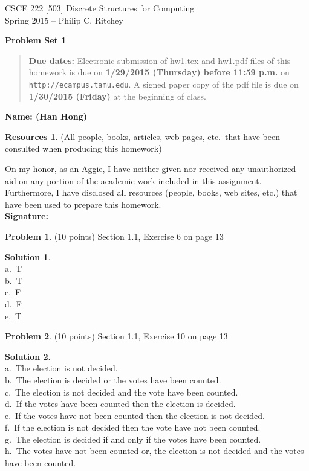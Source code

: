 \documentclass{article}
\theoremstyle{definition}
\newtheorem{problem}{Problem}
\newtheorem*{solution}{Solution}
\newtheorem*{resources}{Resources}
\newcommand{\name}[1]{\noindent\textbf{Name: #1}}
\newcommand{\honor}{\noindent On my honor, as an Aggie, I have neither
  given nor received any unauthorized aid on any portion of the
  academic work included in this assignment. Furthermore, I have
  disclosed all resources (people, books, web sites, etc.) that have
  been used to prepare this homework. \\[2ex]
 \textbf{Signature:} \underline{\hspace*{7cm}} }
\newcommand{\problemset}[1]{\begin{center}\textbf{Problem Set #1}\end{center}}
\newcommand{\duedate}[2]{\begin{quote}\textbf{Due dates:} Electronic
    submission of hw1.tex and hw1.pdf files of this homework is due on
    \textbf{#1} on \texttt{http://ecampus.tamu.edu}.  A signed paper copy of the pdf file is due on
    \textbf{#2} at the beginning of class.\end{quote} }
\begin{document}
\begin{center}
{\large
CSCE 222 [503] Discrete Structures for Computing\\[.5ex]
Spring 2015 -- Philip C. Ritchey\\}
\end{center}

\problemset{1}

\duedate{1/29/2015 (Thursday) before 11:59 p.m.}{1/30/2015 (Friday)}

\name{ (Han Hong) }

\begin{resources} (All people, books, articles, web pages, etc.\ that
  have been consulted when producing this homework)
\end{resources}

\honor

\bigskip

\begin{problem} (10 points) Section 1.1, Exercise 6 on page 13
\end{problem}
\begin{solution}~\\
a.\ T\\
b.\ T\\
c.\ F\\
d.\ F\\
e.\ T\\
\end{solution}

\begin{problem} (10 points) Section 1.1, Exercise 10 on page 13
\end{problem}
\begin{solution}~\\ 
a.\ The election is not decided.\\
b.\ The election is decided or the votes have been counted.\\
c.\ The election is not decided and the vote have been counted.\\
d.\ If the votes have been counted then the election is decided.\\
e.\ If the votes have not been counted then the election is not decided.\\
f.\ If the election is not decided then the vote have not been counted.\\
g.\ The election is decided if and only if the votes have been counted.\\
h.\ The votes have not been counted or, the election is not decided and the votes have been counted.\\
\end{solution}
\end{document}
